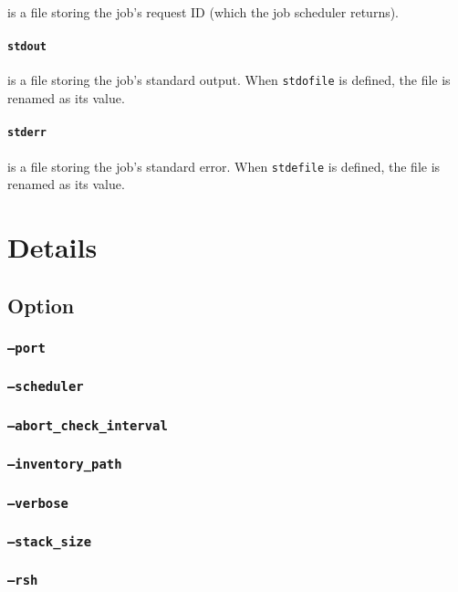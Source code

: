 \documentclass[a4paper,10pt]{report}
\begin{document}
is a file storing the job's request ID (which the job scheduler
returns).

\subsection*{\texttt{stdout}}

is a file storing the job's standard output.  When \texttt{stdofile}
is defined, the file is renamed as its value.

\subsection*{\texttt{stderr}}

is a file storing the job's standard error.  When \texttt{stdefile}
is defined, the file is renamed as its value.

\part{Details}

\chapter{Option}\label{chapoption}

\section{\texttt{--port}}
\section{\texttt{--scheduler}}
\section{\texttt{--abort\_check\_interval}}
\section{\texttt{--inventory\_path}}
\section{\texttt{--verbose}}
\section{\texttt{--stack\_size}}
\section{\texttt{--rsh}}
\end{document}
